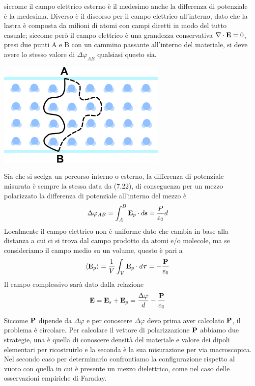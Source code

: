 siccome il campo elettrico esterno \`e il medesimo anche la differenza di potenziale \`e la medesima. Diverso \`e il discorso per il campo elettrico all'interno, dato che la lastra \`e composta da milioni di atomi con campi diretti in modo del tutto casuale;  siccome per\`o il campo elettrico \`e una grandezza conservativa $\nabla \cdot \bold{E} = 0$, presi due punti A e B con un cammino passante all'interno del materiale, si deve avere lo stesso valore di $\Delta \varphi_{AB}$ qualsiasi questo sia.
\begin{center}
	\includegraphics{images/doublepath}
\end{center}
Sia che si scelga un percorso interno o esterno, la differenza di potenziale misurata \`e sempre la stessa data da (7.22), di conseguenza per un mezzo polarizzato la differenza di potenziale all'interno del mezzo \`e 
\begin{equation*}
	\Delta \varphi_{AB} = \int_{A}^{B} \bold{E}_p \cdot d\bold{s} = \frac{P}{\varepsilon_0}d
\end{equation*}
Localmente il campo elettrico non \`e uniforme dato che cambia in base alla distanza a cui ci si trova dal campo prodotto da atomi e/o molecole, ma se consideriamo il campo medio su un volume, questo \`e pari a 
\begin{equation}
	\langle \bold{E}_p \rangle  = \frac{1}{V} \int_{V} \bold{E}_p \cdot d\bm{\tau} = - \frac{\bold{P}}{\varepsilon_0}
\end{equation}
Il campo complessivo sar\`a dato dalla relazione 
\begin{equation*}
	\bold{E} = \bold{E}_{s} + \bold{E}_p = \frac{\Delta \varphi}{d} - \frac{\bold{P}}{\varepsilon_0}
\end{equation*}

Siccome $\bold{P}$ dipende da $\Delta \varphi$ e per conoscere $\Delta \varphi$ devo prima aver calcolato $\bold{P}$, il problema \`e circolare. Per calcolare il vettore di polarizzazione $\bold{P}$ abbiamo due strategie, una \`e quella di conoscere densit\`a del materiale e valore dei dipoli elementari per ricostruirlo e la seconda \`e la sua misurazione per via macroscopica. Nel secondo caso per determinarlo confrontiamo la configurazione rispetto al vuoto con quella in cui \`e presente un mezzo dielettrico, come nel caso delle osservazioni empiriche di Faraday.

